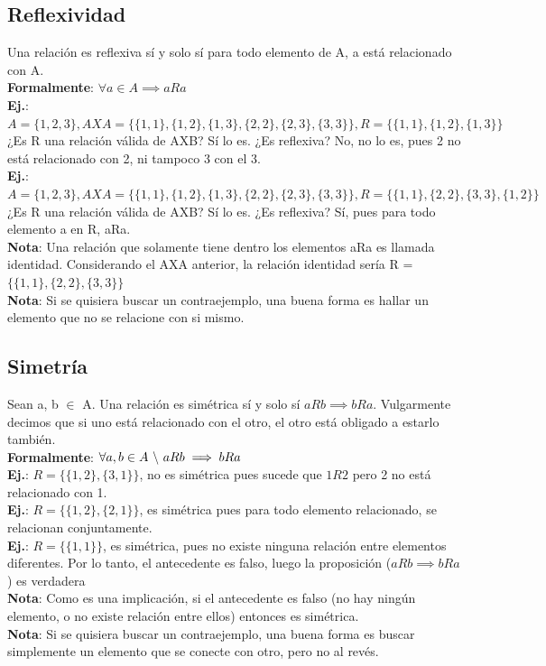 \documentclass[10pt,a4paper]{article}
\begin{document}
\subsection*{Reflexividad}
Una relación es reflexiva sí y solo sí para todo elemento de A, a está relacionado con A. \\
\textbf{Formalmente}: $ \forall a \in A \implies aRa$ \\
\textbf{Ej.}: $A = \{1, 2, 3\}, AXA=\{\{1, 1\}, \{1, 2\}, \{1, 3\}, \{2, 2\}, \{2, 3\}, \{3, 3\}\}, R = \{\{1, 1\}, \{1, 2\}, \{1, 3\}\}$ ¿Es R una relación válida de AXB? Sí lo es. ¿Es reflexiva? No, no lo es, pues 2 no está relacionado con 2, ni tampoco 3 con el 3.\\
\textbf{Ej.}: $A = \{1, 2, 3\}, AXA=\{\{1, 1\}, \{1, 2\}, \{1, 3\}, \{2, 2\}, \{2, 3\}, \{3, 3\}\}, R = \{\{1, 1\}, \{2, 2\}, \{3, 3\}, \{1, 2\}\}$ ¿Es R una relación válida de AXB? Sí lo es. ¿Es reflexiva? Sí, pues para todo elemento a en R, aRa.\\

\textbf{Nota}: Una relación que solamente tiene dentro los elementos aRa es llamada identidad. Considerando el AXA anterior, la relación identidad sería R = $\{\{1, 1\}, \{2, 2\}, \{3, 3\}\}$  \\
\textbf{Nota}: Si se quisiera buscar un contraejemplo, una buena forma es hallar un elemento que no se relacione con si mismo. 
\subsection*{Simetría}
Sean a, b $\in$ A. Una relación es simétrica sí y solo sí $aRb \implies bRa$. Vulgarmente decimos que si uno está relacionado con el otro, el otro está obligado a estarlo también. \\
\textbf{Formalmente}: $ \forall a, b \in A \ \symbol{92} \ aRb \implies bRa$ \\
\textbf{Ej.}: $R = \{\{1, 2\}, \{3, 1\}\}$, no es simétrica pues sucede que $1R2$ pero 2 no está relacionado con 1. \\
\textbf{Ej.}: $R = \{\{1, 2\}, \{2, 1\}\}$, es simétrica pues para todo elemento relacionado, se relacionan conjuntamente. \\
\textbf{Ej.}: $R = \{\{1, 1\}\}$, es simétrica, pues no existe ninguna relación entre elementos diferentes. Por lo tanto, el antecedente es falso, luego la proposición ($aRb \implies bRa$) es verdadera \\

\textbf{Nota}: Como es una implicación, si el antecedente es falso (no hay ningún elemento, o no existe relación entre ellos) entonces es simétrica.  \\
\textbf{Nota}: Si se quisiera buscar un contraejemplo, una buena forma es buscar simplemente un elemento que se conecte con otro, pero no al revés.
\end{document}
